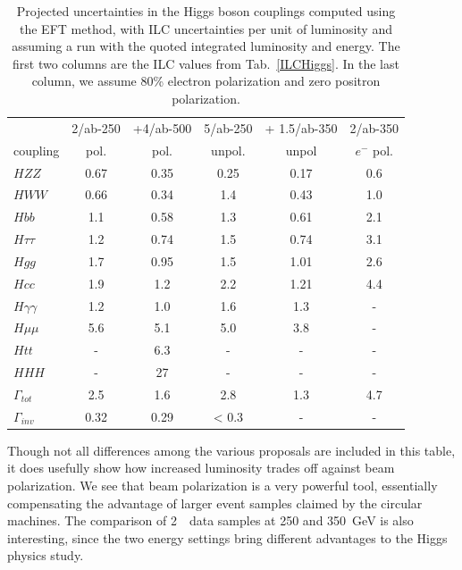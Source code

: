 \begin{table}[!htbp]
\begin{center}
\begin{tabular}{l|cc|c|c|c}
 &  2/ab-250 & +4/ab-500 &  5/ab-250 &  + 1.5/ab-350 &  2/ab-350 \\
coupling &  pol.  &   pol.  &   unpol.  &  unpol &  $e^-$  pol. 
  \\  \hline 
$HZZ$            &             0.67&   0.35    &   0.25   & 0.17     &  0.6            \\ 
$HWW$            &         0.66  &   0.34   &   1.4   &   0.43   &   1.0    \\ 
 $Hbb$            &              1.1  &  0.58   &  1.3    &    0.61  &   2.1   \\ 
$H\tau\tau$    &          1.2  &   0.74   &   1.5   &  0.74    &   3.1     \\ 
$Hgg$ &                      1.7  & 0.95       &  1.5    &  1.01    &   2.6    \\ 
$Hcc$                       &   1.9  &  1.2   &   2.2   &   1.21   &    4.4  \\ 
$H\gamma\gamma$ &  1.2 &   1.0     &  1.6    &   1.3   &    -    \\ 
$H\mu\mu$                &  5.6  &  5.1     &  5.0    &  3.8    &    -
 \\ 
$Htt$  &                       -     &      6.3     &  -    &  -    &
-     \\ 
$HHH$                         &  -    &   27     &   -   &   -   &   -
 \\ \hline 
$\Gamma_{tot}$             & 2.5  & 1.6    &   2.8    &  1.3     &
4.7    \\  
$\Gamma_{inv}$          &   0.32  & 0.29    &  < 0.3    &   -   &   -
\\  \hline
\end{tabular}
\end{center}
\caption{ \label{tab:oursimple}    Projected uncertainties in the Higgs
  boson couplings computed using the EFT method, with  ILC uncertainties per unit of luminosity and assuming a run with the quoted integrated luminosity
  and energy.   The first two columns are the ILC values from 
  Tab.~\ref{ILCHiggs}.   In the last column, we assume 80\% electron polarization and zero positron polarization.  }
\end{table}


Though not all differences among the various proposals are included in
this table, it does usefully show how increased luminosity trades off
against beam polarization.   We see that beam polarization is a very
powerful tool, essentially compensating the advantage of larger event
samples claimed by the circular machines.   The comparison of 2~\iab\
data samples at 250 and 350~GeV is also interesting, since the two
energy settings bring different advantages to the Higgs physics study.


